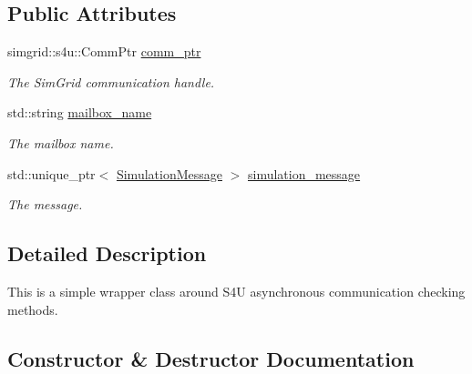\subsection*{Public Attributes}
\begin{DoxyCompactItemize}
\item 
\mbox{\label{classwrench_1_1_s4_u___pending_communication_a1a19cb294e5be0f790181f00daf3c62e}} 
simgrid\+::s4u\+::\+Comm\+Ptr \hyperlink{classwrench_1_1_s4_u___pending_communication_a1a19cb294e5be0f790181f00daf3c62e}{comm\+\_\+ptr}
\begin{DoxyCompactList}\small\item\em The Sim\+Grid communication handle. \end{DoxyCompactList}\item 
\mbox{\label{classwrench_1_1_s4_u___pending_communication_a9b33327c778cdb7cb43a7bb75454cf1e}} 
std\+::string \hyperlink{classwrench_1_1_s4_u___pending_communication_a9b33327c778cdb7cb43a7bb75454cf1e}{mailbox\+\_\+name}
\begin{DoxyCompactList}\small\item\em The mailbox name. \end{DoxyCompactList}\item 
\mbox{\label{classwrench_1_1_s4_u___pending_communication_ae72d7e9697f88bef7e84625fbda8a417}} 
std\+::unique\+\_\+ptr$<$ \hyperlink{classwrench_1_1_simulation_message}{Simulation\+Message} $>$ \hyperlink{classwrench_1_1_s4_u___pending_communication_ae72d7e9697f88bef7e84625fbda8a417}{simulation\+\_\+message}
\begin{DoxyCompactList}\small\item\em The message. \end{DoxyCompactList}\end{DoxyCompactItemize}


\subsection{Detailed Description}
This is a simple wrapper class around S4U asynchronous communication checking methods. 

\subsection{Constructor \& Destructor Documentation}
\mbox{\label{classwrench_1_1_s4_u___pending_communication_afd1c2260a72a827992f883386b9b2df6}} 
